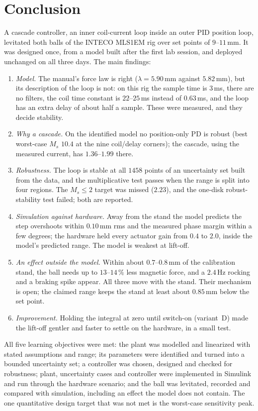 \documentclass[11pt,a4paper]{article}
\begin{document}
\section{Conclusion}
\label{sec:conclusion}
A cascade controller, an inner coil-current loop inside an outer PID position loop, levitated both balls of the INTECO MLS1EM
rig over set points of $9$--$11$\,mm. It was designed once, from a model built after the first lab session, and deployed
unchanged on all three days. The main findings:
\begin{enumerate}
\item \emph{Model.} The manual's force law is right ($\lambda = 5.90$\,mm against $5.82$\,mm), but its description of the loop is
      not: on this rig the sample time is $3$\,ms, there are no filters, the coil time constant is $22$--$25$\,ms instead of
      $0.63$\,ms, and the loop has an extra delay of about half a sample. These were measured, and they decide stability.
\item \emph{Why a cascade.} On the identified model no position-only PD is robust (best worst-case $M_s$ $10.4$ at the nine
      coil/delay corners); the cascade, using the measured current, has $1.36$--$1.99$ there.
\item \emph{Robustness.} The loop is stable at all $1458$ points of an uncertainty set built from the data, and the
      multiplicative test passes when the range is split into four regions. The $M_s \le 2$ target was missed ($2.23$), and the
      one-disk robust-stability test failed; both are reported.
\item \emph{Simulation against hardware.} Away from the stand the model predicts the step overshoots within $0.10$\,mm rms and the
      measured phase margin within a few degrees; the hardware held every actuator gain from $0.4$ to $2.0$, inside the model's
      predicted range. The model is weakest at lift-off.
\item \emph{An effect outside the model.} Within about $0.7$--$0.8$\,mm of the calibration stand, the ball needs up to
      $13$--$14\,\%$ less magnetic force, and a $2.4$\,Hz rocking and a braking spike appear. All three move with the stand. Their
      mechanism is open; the claimed range keeps the stand at least about $0.85$\,mm below the set point.
\item \emph{Improvement.} Holding the integral at zero until switch-on (variant~D) made the lift-off gentler and faster to settle
      on the hardware, in a small test.
\end{enumerate}
All five learning objectives were met: the plant was modelled and linearized with stated assumptions and range; its parameters
were identified and turned into a bounded uncertainty set; a controller was chosen, designed and checked for robustness; plant,
uncertainty cases and controller were implemented in Simulink and run through the hardware scenario; and the ball was levitated,
recorded and compared with simulation, including an effect the model does not contain. The one quantitative design target that
was not met is the worst-case sensitivity peak.
\end{document}
